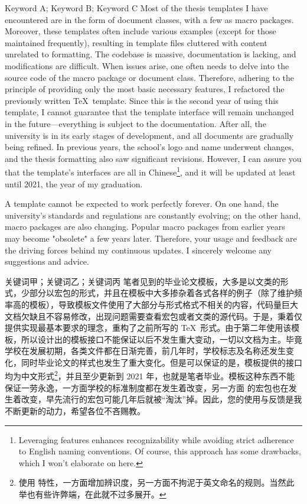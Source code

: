 
\begin{英文摘要}{Keyword A; Keyword B; Keyword C}
  Most of the thesis templates I have encountered are in the form of document classes, with a few as macro packages. Moreover, these templates often include various examples (except for those maintained frequently), resulting in template files cluttered with content unrelated to formatting. The codebase is massive, documentation is lacking, and modifications are difficult. When issues arise, one often needs to delve into the source code of the macro package or document class. Therefore, adhering to the principle of providing only the most basic necessary features, I refactored the previously written \TeX\ template. Since this is the second year of using this template, I cannot guarantee that the template interface will remain unchanged in the future—everything is subject to the documentation. After all, the university is in its early stages of development, and all documents are gradually being refined. In previous years, the school's logo and name underwent changes, and the thesis formatting also saw significant revisions. However, I can assure you that the template's interfaces are all in Chinese\footnote{Leveraging  features enhances recognizability while avoiding strict adherence to English naming conventions. Of course, this approach has some drawbacks, which I won’t elaborate on here.}, and it will be updated at least until 2021, the year of my graduation.
  
  A template cannot be expected to work perfectly forever. On one hand, the university's standards and regulations are constantly evolving; on the other hand,  macro packages are also changing. Popular macro packages from earlier years may become "obsolete" a few years later. Therefore, your usage and feedback are the driving forces behind my continuous updates. I sincerely welcome any suggestions and advice.
  \end{英文摘要}
  
  \begin{中文摘要}{关键词甲；关键词乙；关键词丙}
    笔者见到的毕业论文模板，大多是以文类的形式，少部分以宏包的形式，并且在模板中大多掺杂着各式各样的例子（除了维护频率高的模板），导致模板文件使用了大部分与形式格式不相关的内容，代码量巨大文档欠缺且不容易修改，出现问题需要查看宏包或者文类的源代码。于是，秉着仅提供实现最基本要求的理念，重构了之前所写的 \TeX\ 形式。由于第二年使用该模板，所以设计出的模板接口不能保证以后不发生重大变动，一切以文档为主。毕竟学校在发展初期，各类文件都在日渐完善，前几年时，学校标志及名称还发生变化，同时毕业论文的样式也发生了重大变化。但是可以保证的是，模板提供的接口均为中文形式\footnote{使用  特性，一方面增加辨识度，另一方面不拘泥于英文命名的规则。当然此举也有些许弊端，在此就不过多展开。}，并且至少更新到 2021 年，也就是笔者毕业。模板这种东西不能保证一劳永逸，一方面学校的标准制度都在发生着改变，另一方面  的宏包也在发生着改变，早先流行的宏包可能几年后就被“淘汰”掉。因此，您的使用与反馈是我不断更新的动力，希望各位不吝赐教。
  \end{中文摘要}

  \cleardoublepage

